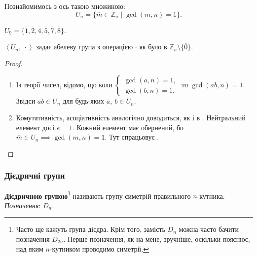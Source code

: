 \documentclass{math_library}
\begin{document}
Познайомимось з ось такою множиною: 
\[ 
U_n = \{ \overline{m} \in \mathbb{Z}_n \mid \gcd(m,n) = 1 \}.
\]

\begin{example}
$U_9 = \{\overline{1},\overline{2},\overline{4},\overline{5},\overline{7},\overline{8} \}$.
\end{example}

\begin{theorem}
$\left<U_n,\ \cdot \right>$ задає абелеву група з операцією $\cdot$ як було в $\mathbb{Z}_n \setminus \{ \overline{0} \}$.
\end{theorem}

\begin{proof}
\begin{enumerate}[nosep,wide=0pt,label={\roman*.}]
\item Із теорії чисел, відомо, що коли $\begin{cases} \gcd(a,n) = 1, \\ \gcd(b,n) = 1, \end{cases}$ то $\gcd(ab,n) = 1$. Звідси $\overline{ab} \in U_n$ для будь-яких $\overline{a},\ \overline{b} \in U_n$.

\item Комутативність, асоціативність аналогічно доводиться, як і в . Нейтральний елемент досі $\overline{e} = \overline{1}$. Кожний елемент має обернений, бо $\overline{m} \in U_n \implies \gcd(m,n) = 1$. Тут спрацьовує . \qedhere
\end{enumerate}
\end{proof}

\subsubsection{Дієдричні групи}
\begin{definition}
\textbf{Дієдричною групою}\footnote{Часто ще кажуть група дієдра. Крім того, замість $D_n$ можна часто бачити позначення $D_{2n}$. Перше позначення, як на мене, зручніше, оскільки пояснює, над яким $n$-кутником проводимо симетрії.} називають групу симетрій правильного $n$-кутника.\\
\textit{Позначення}: $D_n$.
\end{definition}
\end{document}
